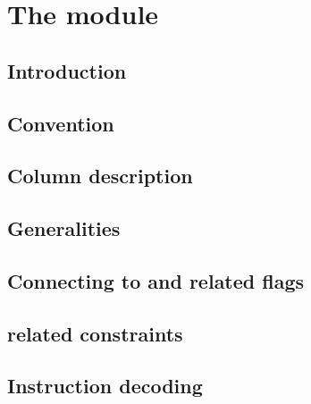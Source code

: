 
\section{The \romMod{} module}                                   \label{rom}
\subsection{Introduction}                                        \label{rom: intro}                        
\subsection{Convention}                                          \label{rom: convention}                   
\subsection{Column description}                                  \label{rom: columns}                      
\subsection{Generalities}                                        \label{rom: constraints}                  
\subsection{Connecting \romColumnLimbByte{} to \romColumnOpcode{} and related flags}      \label{rom: opcode related constraints}   
\subsection{ related constraints}                     \label{rom: push related constraints}     
\subsection{Instruction decoding}                                \label{rom: instruction decoding}         
